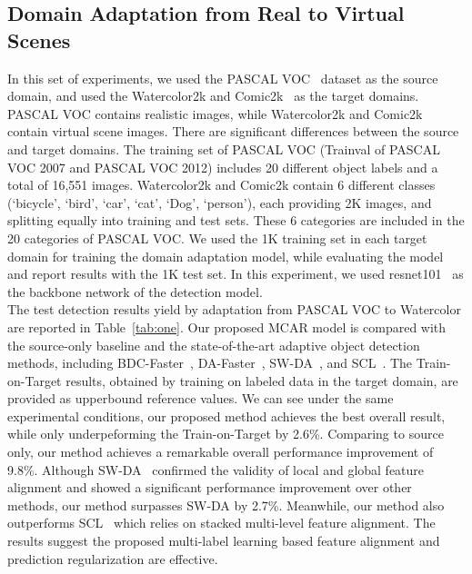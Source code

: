 \documentclass[runningheads]{llncs}
\begin{document}
\subsection{Domain Adaptation from Real to Virtual Scenes}

In this set of experiments, 
we used the PASCAL VOC~\cite{everingham2010pascal} dataset as the source domain, 
and used the Watercolor2k and Comic2k~\cite{inoue2018cross} as the target domains. 
PASCAL VOC contains realistic images, while Watercolor2k and Comic2k contain virtual scene images. 
There are significant differences between the source and target domains. 
The training set of PASCAL VOC (Trainval of PASCAL VOC 2007 and PASCAL VOC 2012) includes 
20 different object labels and a total of 16,551 images. 
Watercolor2k and Comic2k contain 6 different classes (`bicycle', `bird', `car', `cat', `Dog', `person'), each providing 2K images, and splitting equally into training and test sets. 
These 6 categories are included in the 20 categories of PASCAL VOC. 
We used the 1K training set in each target domain 
for training the domain adaptation model,
while evaluating the model and report results with the 1K test set.
In this experiment, 
we used resnet101~\cite{he2016deep} as the backbone network of the detection model.
\\

The test detection results yield by 
adaptation from PASCAL VOC to Watercolor are reported in Table~\ref{tab:one}. 
Our proposed MCAR model is compared with 
the source-only baseline and the state-of-the-art adaptive object detection methods, including
BDC-Faster~\cite{saito2019strong},
DA-Faster~\cite{chen2018domain}, 
SW-DA~\cite{saito2019strong},
and SCL~\cite{shen2019scl}. 
The Train-on-Target results, obtained by training on labeled data in the target domain, are provided
as upperbound reference values.
We can see under the same experimental conditions, 
our proposed method achieves the best overall result, 
while only underpeforming the Train-on-Target by 2.6\%. 
Comparing to source only, our method achieves a remarkable overall performance improvement of 9.8\%. 
Although SW-DA~\cite{saito2019strong} confirmed the validity of local and global feature alignment and showed a significant performance improvement over other methods, our method surpasses SW-DA by 2.7\%. 
Meanwhile, our method also outperforms SCL~\cite{shen2019scl} which relies on stacked multi-level feature alignment.
The results suggest the proposed multi-label learning based feature alignment and prediction regularization
are effective.
\\
\end{document}
